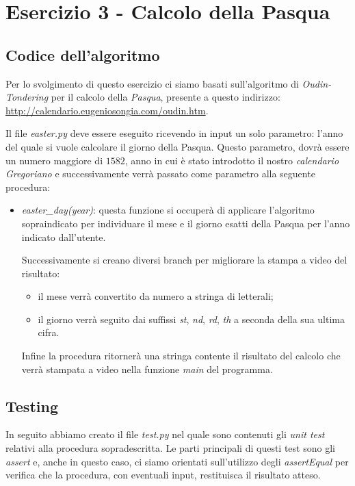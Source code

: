 \documentclass[a4paper, 12pt]{article}
\begin{document}
	\newpage
	\section*{Esercizio 3 - Calcolo della Pasqua}
	
	\subsection*{Codice dell'algoritmo}
	Per lo svolgimento di questo esercizio ci siamo basati sull'algoritmo di \textit{Oudin-Tondering} per il calcolo della \textit{Pasqua}, presente a questo indirizzo: \url{http://calendario.eugeniosongia.com/oudin.htm}.
	
	Il file \textit{easter.py} deve essere eseguito ricevendo in input un solo parametro: l'anno del quale si vuole calcolare il giorno della Pasqua. Questo parametro, dovrà essere un numero maggiore di $1582$, anno in cui è stato introdotto il nostro \textit{calendario Gregoriano} e successivamente verrà passato come parametro alla seguente procedura:
	\begin{itemize}
		\item \textit{easter\_day(year)}: questa funzione si occuperà di applicare l'algoritmo sopraindicato per individuare il mese e il giorno esatti della Pasqua per l'anno indicato dall'utente.
		
		Successivamente si creano diversi branch per migliorare la stampa a video del risultato:
		\begin{itemize}
			\item il mese verrà convertito da numero a stringa di letterali;
			\item il giorno verrà seguito dai suffissi \textit{st}, \textit{nd}, \textit{rd}, \textit{th} a seconda della sua ultima cifra.
		\end{itemize}
		
		Infine la procedura ritornerà una stringa contente il risultato del calcolo che verrà stampata a video nella funzione \textit{main} del programma.
	\end{itemize}
	
	\subsection*{Testing}
	In seguito abbiamo creato il file \textit{test.py} nel quale sono contenuti gli \textit{unit test} relativi alla procedura sopradescritta. Le parti principali di questi test sono gli \textit{assert} e, anche in questo caso, ci siamo orientati sull'utilizzo degli \textit{assertEqual} per verifica che la procedura, con eventuali input, restituisca il risultato atteso.
	
\end{document}
